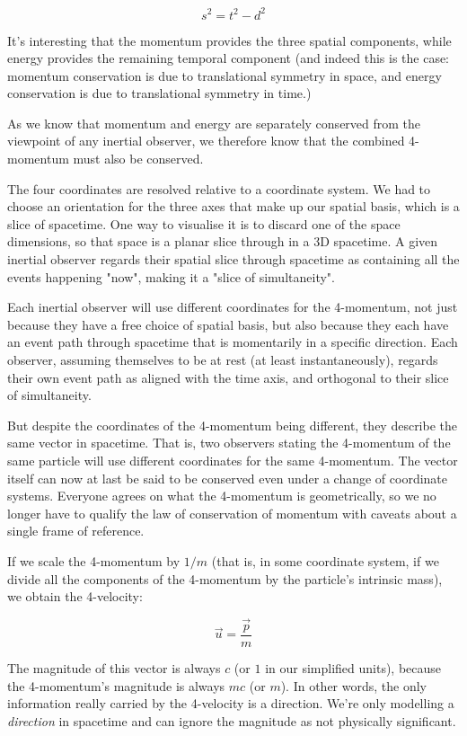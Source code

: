 $$s^2 = t^2 - d^2$$

It's interesting that the momentum provides the three spatial components, while energy provides the remaining temporal component (and indeed this is the case: momentum conservation is due to translational symmetry in space, and energy conservation is due to translational symmetry in time.)

As we know that momentum and energy are separately conserved from the viewpoint of any inertial observer, we therefore know that the combined 4-momentum must also be conserved.

The four coordinates are resolved relative to a coordinate system. We had to choose an orientation for the three axes that make up our spatial basis, which is a slice of spacetime. One way to visualise it is to discard one of the space dimensions, so that space is a planar slice through in a 3D spacetime. A given inertial observer regards their spatial slice through spacetime as containing all the events happening "now", making it a "slice of simultaneity".

Each inertial observer will use different coordinates for the 4-momentum, not just because they have a free choice of spatial basis, but also because they each have an event path through spacetime that is momentarily in a specific direction. Each observer, assuming themselves to be at rest (at least instantaneously), regards their own event path as aligned with the time axis, and orthogonal to their slice of simultaneity.

But despite the coordinates of the 4-momentum being different, they describe the same vector in spacetime. That is, two observers stating the 4-momentum of the same particle will use different coordinates for the same 4-momentum. The vector itself can now at last be said to be conserved even under a change of coordinate systems. Everyone agrees on what the 4-momentum is geometrically, so we no longer have to qualify the law of conservation of momentum with caveats about a single frame of reference.

If we scale the 4-momentum by $1/m$ (that is, in some coordinate system, if we divide all the components of the 4-momentum by the particle's intrinsic mass), we obtain the 4-velocity:

$$\vec{u} = \frac{\vec{p}}{m}$$

The magnitude of this vector is always $c$ (or $1$ in our simplified units), because the 4-momentum's magnitude is always $mc$ (or $m$). In other words, the only information really carried by the 4-velocity is a direction. We're only modelling a \textit{direction} in spacetime and can ignore the magnitude as not physically significant.

